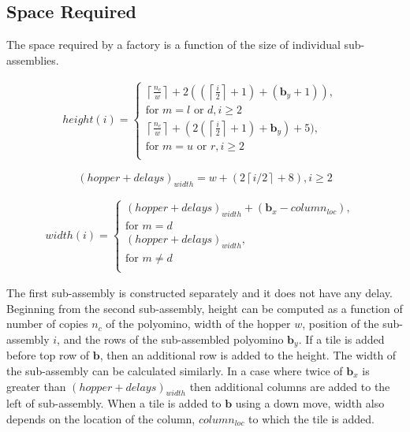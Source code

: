 \subsection{Space Required}\label{sec:requiredSpace}
The space required by a factory is a function of the size of individual sub-assemblies.

\begin{align}
height(i)=
\begin{cases}
\left \lceil{   \frac{n_c}{w}}\right \rceil+2((\left \lceil{\frac{i}{2}}\right \rceil+1)+(\mathbf{b}_y+1)),&\\ 
\text{for } m = l \text{ or } d, i \geq 2&\\
\left \lceil{   \frac{n_c}{w}}\right \rceil+(2(\left \lceil{\frac{i}{2}}\right \rceil+1)+\mathbf{b}_y)+5),&\\ 
\text{for } m = u \text{ or } r, i \geq 2&\\
\end{cases}
\end{align}



\begin{equation}
(hopper+delays)_{width}=w+(2\left \lceil{i/2}\right \rceil+8),  i \geq 2
\end{equation}

\begin{align}
width(i)=
\begin{cases}
(hopper+delays)_{width}+(\mathbf{b}_x-column_{loc}),&\\ 
\text{for } m = d &\\
(hopper+delays)_{width},&\\ 
\text{for } m \neq d &\\
\end{cases}
\end{align}

The first sub-assembly is constructed separately and it does not have any delay.
Beginning from the second sub-assembly, height can be computed as a function of number of copies $n_c$ of the polyomino, width of the hopper $w$, position of the sub-assembly $i$, and the rows of the sub-assembled polyomino $\mathbf{b}_y$. If a tile is added before top row of $\mathbf{b}$, then an additional row is added to the height.
The width of the sub-assembly can be calculated similarly. 
In a case where twice of $\mathbf{b}_x$ is greater than $(hopper+delays)_{width}$ then additional columns are added to the left of sub-assembly. 
When a tile is added to $\mathbf{b}$ using a down move, width also depends on the location of the column, $column_{loc}$ to which the tile is added.  
  


